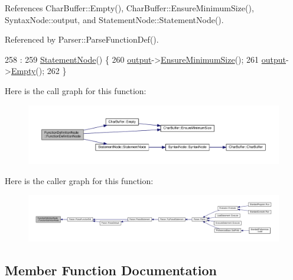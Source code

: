 References Char\+Buffer\+::\+Empty(), Char\+Buffer\+::\+Ensure\+Minimum\+Size(), Syntax\+Node\+::output, and Statement\+Node\+::\+Statement\+Node().



Referenced by Parser\+::\+Parse\+Function\+Def().


\begin{DoxyCode}
258                                                :
259     \hyperlink{classStatementNode_a586026d6009a39d087792d621de86360}{StatementNode}() \{
260     \hyperlink{classSyntaxNode_a1180628cbe3fce43930cee0df5a9ce5c}{output}->\hyperlink{classCharBuffer_ae742439a2d5d5a0ad64411dcbf4604c8}{EnsureMinimumSize}();
261     \hyperlink{classSyntaxNode_a1180628cbe3fce43930cee0df5a9ce5c}{output}->\hyperlink{classCharBuffer_abe39d3fd7d8b9c8ec343af2cae7adc96}{Empty}();
262 \}
\end{DoxyCode}


Here is the call graph for this function\+:
\nopagebreak
\begin{figure}[H]
\begin{center}
\leavevmode
\includegraphics[width=350pt]{da/dec/classFunctionDefinitionNode_a1ecb6319492be964ad5089739cf65d63_cgraph}
\end{center}
\end{figure}




Here is the caller graph for this function\+:
\nopagebreak
\begin{figure}[H]
\begin{center}
\leavevmode
\includegraphics[width=350pt]{da/dec/classFunctionDefinitionNode_a1ecb6319492be964ad5089739cf65d63_icgraph}
\end{center}
\end{figure}




\subsection{Member Function Documentation}
